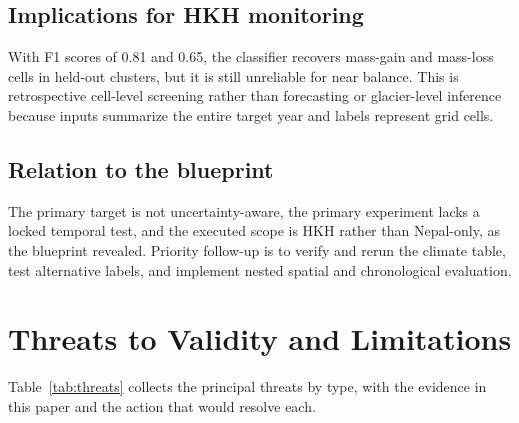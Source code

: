 \documentclass[conference]{IEEEtran}
\begin{document}
\subsection{Implications for HKH monitoring}
With F1 scores of 0.81 and 0.65, the classifier recovers mass-gain and mass-loss cells in held-out clusters, but it is still unreliable for near balance. This is retrospective cell-level screening rather than forecasting or glacier-level inference because inputs summarize the entire target year and labels represent grid cells.

\subsection{Relation to the blueprint}
The primary target is not uncertainty-aware, the primary experiment lacks a locked temporal test, and the executed scope is HKH rather than Nepal-only, as the blueprint revealed. Priority follow-up is to verify and rerun the climate table, test alternative labels, and implement nested spatial and chronological evaluation.

\section{Threats to Validity and Limitations}\label{sec:threats}
Table~\ref{tab:threats} collects the principal threats by type, with the evidence in this paper and the action that would resolve each.
\end{document}
